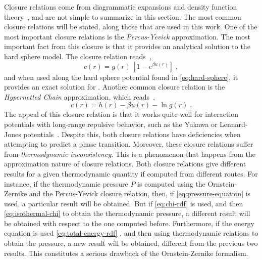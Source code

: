 Closure relations come from diagrammatic expansions and density function theory~\cite{hansenTheorySimpleLiquids2013},
and are not simple to summarize in this section. The most common closure relations will be
stated, along those that are used in this work. One of the most important closure relations
is the \emph{Percus-Yevick} approximation.
The most important fact from this closure is that it provides an analytical solution to the 
hard sphere model. The closure relation reads~\cite{percusAnalysisClassicalStatistical1958},
\begin{equation}
    c(r) = g(r) \, \left[1 - e^{\beta u(r)}\right]
    \; ,
    \label{eq:py-cr}
\end{equation}
and when used along the hard sphere potential found in \autoref{eq:hard-sphere}, it provides
an exact solution for \rdf.
Another common closure relation is the \emph{Hypernetted Chain} approximation,
which reads~\cite{hansenTheorySimpleLiquids2013},
\begin{equation}
    c(r) = h(r) - \beta u(r) - \ln{g(r)} \; .
    \label{eq:hnc-cr}
\end{equation}
The appeal of this closure relation is that it works quite well for interaction potentials 
with long-range repulsive behavior, such as the Yukawa or Lennard-Jones potentials~\cite{hansenTheorySimpleLiquids2013}.
Despite this, both closure relations have deficiencies when attempting to predict a
phase transition. Moreover, these closure relations suffer from
\emph{thermodynamic inconsistency}. This is a phenomenon that happens from the approximation
nature of closure relations. Both closure relations give different results for
a given thermodynamic quantity if computed from different routes. For instance, if the 
thermodynamic pressure $P$ is computed using the Ornstein-Zernike and the 
Percus-Yevick closure relation, then, if \autoref{eq:pressure-equation} is used, a 
particular result will be obtained.
But if \autoref{eq:chi-rdf} is used, and then \autoref{eq:isothermal-chi} to obtain the 
thermodynamic pressure, a different result will be obtained with respect to the one
computed before. Furthermore, if the energy equation is used
\textemdash \autoref{eq:total-energy-rdf} \textemdash, 
and then using thermodynamic relations to obtain the pressure, a new result will be 
obtained, different from the previous two results. This constitutes a serious drawback of
the Ornstein-Zernike formalism.

